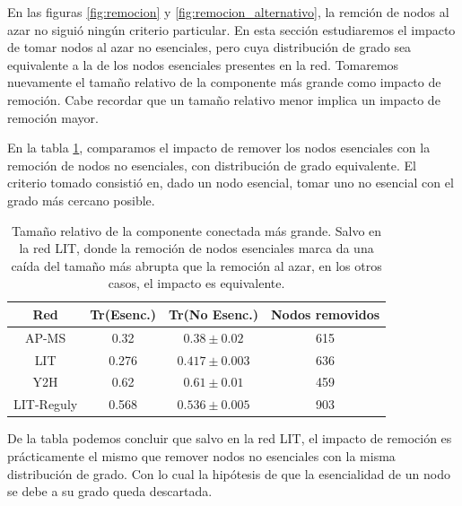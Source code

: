 \par En las figuras \ref{fig:remocion} y \ref{fig:remocion_alternativo}, la remción de nodos al azar no siguió ningún criterio particular. En esta sección estudiaremos el impacto de tomar nodos al azar no esenciales, pero cuya distribución de grado sea equivalente a la de los nodos esenciales presentes en la red. Tomaremos nuevamente el tamaño relativo de la componente más grande como impacto de remoción. Cabe recordar que un tamaño relativo menor implica un impacto de remoción mayor.
\par En la tabla \ref{table:remocion}, comparamos el impacto de remover los nodos esenciales con la remoción de nodos no esenciales, con distribución de grado equivalente. El criterio tomado consistió en, dado un nodo esencial, tomar uno no esencial con el grado más cercano posible.
\begin{table}
\centering
\begin{tabular}{c c c c}
\hline \hline
Red & Tr(Esenc.) & Tr(No Esenc.) & Nodos removidos \\
\hline
AP-MS & 0.32 & $0.38 \pm 0.02$ & 615 \\
LIT & 0.276 & $0.417 \pm 0.003$ & 636 \\
Y2H & 0.62 & $0.61 \pm 0.01$ & 459 \\
LIT-Reguly & 0.568 & $0.536 \pm 0.005$ & 903 \\
\hline
\end{tabular}
\caption{Tamaño relativo de la componente conectada más grande. Salvo en la red LIT, donde la remoción de nodos esenciales marca da una caída del tamaño más abrupta que la remoción al azar, en los otros casos, el impacto es equivalente.}
\label{table:remocion}
\end{table}
\par De la tabla podemos concluir que salvo en la red LIT, el impacto de remoción es prácticamente el mismo que remover nodos no esenciales con la misma distribución de grado. Con lo cual la hipótesis de que la esencialidad de un nodo se debe a su grado queda descartada.

